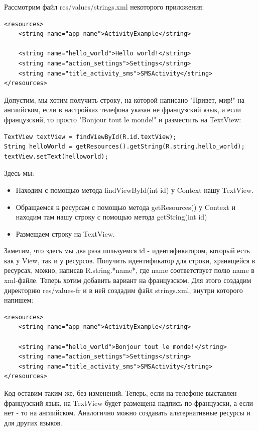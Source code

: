 \documentclass[12 pt]{article}
\begin{document}
Рассмотрим файл res/values/strings.xml некоторого приложения:
	\begin{lstlisting}
<resources>
    <string name="app_name">ActivityExample</string>

    <string name="hello_world">Hello world!</string>
    <string name="action_settings">Settings</string>
    <string name="title_activity_sms">SMSActivity</string>
</resources>
    \end{lstlisting}
Допустим, мы хотим получить строку, на которой написано "Привет, мир!" на английском, если в настройках телефона указан не французский язык, а если французский, то просто "Bonjour tout le monde!" и разместить на TextView:
	\begin{lstlisting}
TextView textView = findViewById(R.id.textView);
String helloWorld = getResources().getString(R.string.hello_world);
textView.setText(helloworld);
    \end{lstlisting}
Здесь мы:
\begin{itemize}
\item Находим с помощью метода findViewById(int id) у Context нашу TextView. 
\item Обращаемся к ресурсам с помощью метода getResources() у Context и находим там нашу строку с помощью метода getString(int id)
\item Размещаем строку на TextView.
\end{itemize}
Заметим, что здесь мы два раза пользуемся id - идентификатором, который есть как у View, так и у ресурсов. Получить идентификатор для строки, хранящейся в ресурсах, можно, написав R.string.*name*, где name соответствует полю name в xml-файле.\newline
Теперь хотим добавить вариант на французском. Для этого создадим директорию res/values-fr и в ней создадим файл strings.xml, внутри которого напишем:
	\begin{lstlisting}
<resources>
    <string name="app_name">ActivityExample</string>

    <string name="hello_world">Bonjour tout le monde!</string>
    <string name="action_settings">Settings</string>
    <string name="title_activity_sms">SMSActivity</string>
</resources>    
    \end{lstlisting}
Код оставим таким же, без изменений. Теперь, если на телефоне выставлен французский язык, на TextView будет размещена надпись по-французски, а если нет - то на английском. Аналогично можно создавать альтернативные ресурсы и для других языков.
\end{document}
